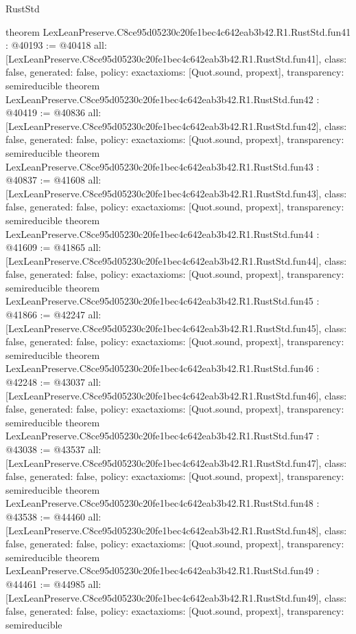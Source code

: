 \begin{lexlean}{RustStd}
\begin{coremodule}
{}
theorem LexLeanPreserve.C8ce95d05230c20fe1bec4c642eab3b42.R1.RustStd.fun41 : @40193 := @40418 {
  all: [LexLeanPreserve.C8ce95d05230c20fe1bec4c642eab3b42.R1.RustStd.fun41],
  class: false,
  generated: false,
  policy: exact{axioms: [Quot.sound, propext]},
  transparency: semireducible
}
theorem LexLeanPreserve.C8ce95d05230c20fe1bec4c642eab3b42.R1.RustStd.fun42 : @40419 := @40836 {
  all: [LexLeanPreserve.C8ce95d05230c20fe1bec4c642eab3b42.R1.RustStd.fun42],
  class: false,
  generated: false,
  policy: exact{axioms: [Quot.sound, propext]},
  transparency: semireducible
}
theorem LexLeanPreserve.C8ce95d05230c20fe1bec4c642eab3b42.R1.RustStd.fun43 : @40837 := @41608 {
  all: [LexLeanPreserve.C8ce95d05230c20fe1bec4c642eab3b42.R1.RustStd.fun43],
  class: false,
  generated: false,
  policy: exact{axioms: [Quot.sound, propext]},
  transparency: semireducible
}
theorem LexLeanPreserve.C8ce95d05230c20fe1bec4c642eab3b42.R1.RustStd.fun44 : @41609 := @41865 {
  all: [LexLeanPreserve.C8ce95d05230c20fe1bec4c642eab3b42.R1.RustStd.fun44],
  class: false,
  generated: false,
  policy: exact{axioms: [Quot.sound, propext]},
  transparency: semireducible
}
theorem LexLeanPreserve.C8ce95d05230c20fe1bec4c642eab3b42.R1.RustStd.fun45 : @41866 := @42247 {
  all: [LexLeanPreserve.C8ce95d05230c20fe1bec4c642eab3b42.R1.RustStd.fun45],
  class: false,
  generated: false,
  policy: exact{axioms: [Quot.sound, propext]},
  transparency: semireducible
}
theorem LexLeanPreserve.C8ce95d05230c20fe1bec4c642eab3b42.R1.RustStd.fun46 : @42248 := @43037 {
  all: [LexLeanPreserve.C8ce95d05230c20fe1bec4c642eab3b42.R1.RustStd.fun46],
  class: false,
  generated: false,
  policy: exact{axioms: [Quot.sound, propext]},
  transparency: semireducible
}
theorem LexLeanPreserve.C8ce95d05230c20fe1bec4c642eab3b42.R1.RustStd.fun47 : @43038 := @43537 {
  all: [LexLeanPreserve.C8ce95d05230c20fe1bec4c642eab3b42.R1.RustStd.fun47],
  class: false,
  generated: false,
  policy: exact{axioms: [Quot.sound, propext]},
  transparency: semireducible
}
theorem LexLeanPreserve.C8ce95d05230c20fe1bec4c642eab3b42.R1.RustStd.fun48 : @43538 := @44460 {
  all: [LexLeanPreserve.C8ce95d05230c20fe1bec4c642eab3b42.R1.RustStd.fun48],
  class: false,
  generated: false,
  policy: exact{axioms: [Quot.sound, propext]},
  transparency: semireducible
}
theorem LexLeanPreserve.C8ce95d05230c20fe1bec4c642eab3b42.R1.RustStd.fun49 : @44461 := @44985 {
  all: [LexLeanPreserve.C8ce95d05230c20fe1bec4c642eab3b42.R1.RustStd.fun49],
  class: false,
  generated: false,
  policy: exact{axioms: [Quot.sound, propext]},
  transparency: semireducible
}
\end{coremodule}
\end{lexlean}
